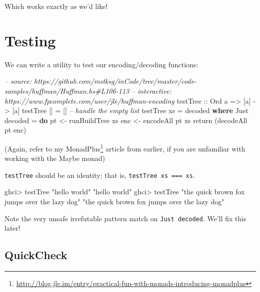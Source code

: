 \documentclass[]{article}
\newenvironment{Shaded}{}{}
\newcommand{\KeywordTok}[1]{\textcolor[rgb]{0.00,0.44,0.13}{\textbf{{#1}}}}
\newcommand{\DataTypeTok}[1]{\textcolor[rgb]{0.56,0.13,0.00}{{#1}}}
\newcommand{\StringTok}[1]{\textcolor[rgb]{0.25,0.44,0.63}{{#1}}}
\newcommand{\CommentTok}[1]{\textcolor[rgb]{0.38,0.63,0.69}{\textit{{#1}}}}
\newcommand{\OtherTok}[1]{\textcolor[rgb]{0.00,0.44,0.13}{{#1}}}
\newcommand{\FunctionTok}[1]{\textcolor[rgb]{0.02,0.16,0.49}{{#1}}}
\newcommand{\NormalTok}[1]{{#1}}
\renewcommand{\href}[2]{#2\footnote{\url{#1}}}
\begin{document}
Which works exactly as we'd like!

\section{Testing}\label{testing}

We can write a utility to test our encoding/decoding functions:

\begin{Shaded}
\begin{Highlighting}[]
\CommentTok{-- source: https://github.com/mstksg/inCode/tree/master/code-samples/huffman/Huffman.hs#L106-113}
\CommentTok{-- interactive: https://www.fpcomplete.com/user/jle/huffman-encoding}
\OtherTok{testTree ::} \DataTypeTok{Ord} \NormalTok{a }\OtherTok{=>} \NormalTok{[a] }\OtherTok{->} \NormalTok{[a]}
\NormalTok{testTree [] }\FunctionTok{=} \NormalTok{[]                    }\CommentTok{-- handle the empty list}
\NormalTok{testTree xs }\FunctionTok{=} \NormalTok{decoded}
  \KeywordTok{where}
    \DataTypeTok{Just} \NormalTok{decoded }\FunctionTok{=} \KeywordTok{do}
      \NormalTok{pt  }\OtherTok{<-} \NormalTok{runBuildTree xs}
      \NormalTok{enc }\OtherTok{<-} \NormalTok{encodeAll pt xs}
      \NormalTok{return (decodeAll pt enc)}
\end{Highlighting}
\end{Shaded}

(Again, refer to my
\href{http://blog.jle.im/entry/practical-fun-with-monads-introducing-monadplus}{MonadPlus}
article from earlier, if you are unfamiliar with working with the Maybe
monad)

\texttt{testTree} should be an identity; that is,
\texttt{testTree\ xs\ ===\ xs}.

\begin{Shaded}
\begin{Highlighting}[]
\NormalTok{ghci}\FunctionTok{>} \NormalTok{testTree }\StringTok{"hello world"}
\StringTok{"hello world"}
\NormalTok{ghci}\FunctionTok{>} \NormalTok{testTree }\StringTok{"the quick brown fox jumps over the lazy dog"}
\StringTok{"the quick brown fox jumps over the lazy dog"}
\end{Highlighting}
\end{Shaded}

Note the very unsafe irrefutable pattern match on
\texttt{Just\ decoded}. We'll fix this later!

\subsection{QuickCheck}\label{quickcheck}
\end{document}
